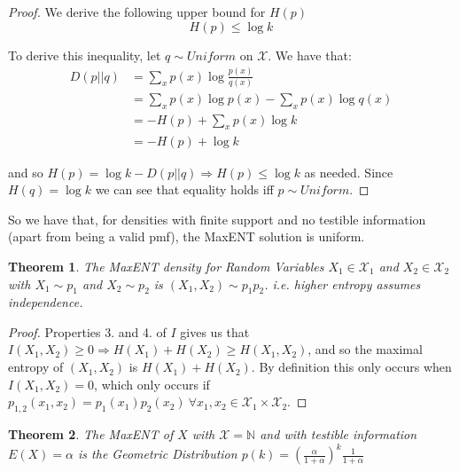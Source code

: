 \documentclass[]{article}
\theoremstyle{mattstyle}
\newtheorem{theorem}{Theorem}[section]
\theoremstyle{definition}
\begin{document}
\begin{proof}
	We derive the following upper bound for \(H(p)\)
	\begin{equation}
	H(p) \le \log k
	\end{equation}
	
	To derive this inequality, let \(q\sim Uniform\) on $\mathcal{X}$. We have that:
	\begin{align*}
	D(p||q)&=\sum_{x}p(x)\log\frac{p(x)}{q(x)}\\
	&=\sum_{x}p(x)\log p(x)-\sum_xp(x)\log q(x)\\
	&= -H(p) + \sum_xp(x)\log k \\
	&= -H(p) + \log k
	\end{align*}
	
	and so \(H(p)=\log k-D(p||q) \Rightarrow H(p) \le \log k \) as needed. Since $H(q) = \log k$ we can see that equality holds iff $p \sim Uniform$.
\end{proof}

So we have that, for densities with finite support and no testible information (apart from being a valid pmf), the MaxENT solution is uniform.


\begin{theorem}
	The MaxENT density for Random Variables $X_1 \in \mathcal{X}_1$ and $X_2 \in \mathcal{X}_2$ with $X_1 \sim p_1$ and $X_2 \sim p_2$ is \( (X_1,X_2)\sim p_1p_2 \). i.e. higher entropy assumes independence.
\end{theorem}

\begin{proof}
Properties 3. and 4. of $I$ gives us that \(I(X_1,X_2)\ge0 \Rightarrow H(X_1) + H(X_2) \ge H(X_1,X_2) \), and so the maximal entropy of \((X_1,X_2)\) is \(H(X_1) + H(X_2)\). By definition this only occurs when \(I(X_1,X_2)=0\), which only occurs if
\(p_{1,2}(x_1,x_2)=p_1(x_1)p_2(x_2) \ \forall x_1,x_2 \in \mathcal{X}_1\times\mathcal{X}_2\).
\end{proof}

\begin{theorem}
The MaxENT of $X$ with $\mathcal{X} = \mathbb{N}$ and with testible information $E(X)=\alpha$ is the Geometric Distribution $p(k)=\left(\frac{\alpha}{1+\alpha}\right)^k \frac{1}{1+\alpha}$
\end{theorem}
\end{document}

